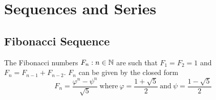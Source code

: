 \section{Sequences and Series}

\subsection{Fibonacci Sequence}

\begin{theorem}
The Fibonacci numbers \(F_n: n \in \mathbb N\) are such that
\(F_1 = F_2 = 1\) and \(F_n = F_{n - 1} + F_{n - 2}\).  \(F_n\) can be given
by the closed form
\begin{equation*}
F_n = \frac{\varphi^n - \psi^n}{\sqrt 5}
\ \text{where}\ \varphi = \frac{1 + \sqrt 5} 2
\ \text{and}\ \psi = \frac{1 - \sqrt 5} 2
\end{equation*}
\end{theorem}
